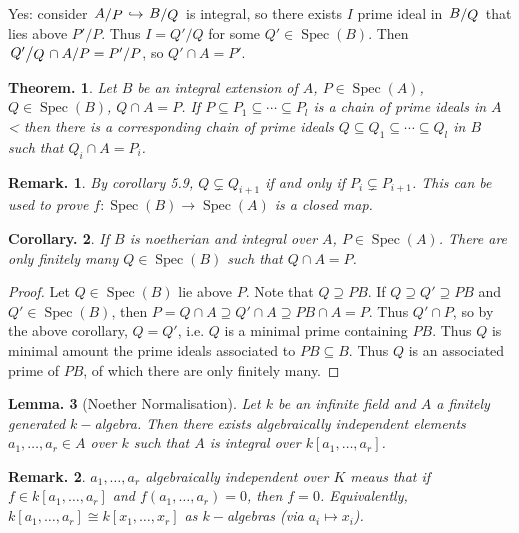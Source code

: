 \documentclass[11pt, a4paper]{memoir}
\newcommand{\hto}[0]{\ensuremath{\hookrightarrow}}
\theoremstyle{change}
\newtheorem{theorem}{Theorem.}[section]
\newtheorem{lemma}[theorem]{Lemma.}
\newtheorem{corollary}[theorem]{Corollary.}
\theoremstyle{plain}
\theoremstyle{nonumberplain}
\newtheorem{remark}{Remark.}
\newtheorem{proof}{Proof}
\DeclareMathOperator{\Spec}{Spec}
\newcommand{\quot}[2]{\mathchoice{\left.\raisebox{0.12em}{$#1$}\middle/\raisebox{-0.12em}{$#2$}\right.}
                                 {\left.\raisebox{0.06em}{$#1$}\middle/\raisebox{-0.06em}{$#2$}\right.}
                                 {\left.\raisebox{0.02em}{$#1$}\middle/\raisebox{-0.02em}{$#2$}\right.}
                                 {\left.\raisebox{0em}{$#1$}\middle/\raisebox{0em}{$#2$}\right.}}
\numberwithin{equation}{section}
\begin{document}
Yes: consider $\quot{A}{P}\hto \quot{B}{Q}$ is integral, so there exists $I$ prime ideal in $\quot{B}{Q}$ that lies above $P'/P$.
Thus $I=Q'/Q$ for some $Q'\in\Spec(B)$.
Then $\quot{Q'}{Q}\cap A/P=P'/P$, so $Q'\cap A=P'$.
\begin{theorem}
    Let $B$ be an integral extension of $A$, $P\in\Spec(A)$, $Q\in\Spec(B)$, $Q\cap A=P$.
    If $P\subseteq P_1\subseteq\cdots\subseteq P_l$ is a chain of prime ideals in $A$< then there is a corresponding chain of prime ideals $Q\subseteq Q_1\subseteq\cdots\subseteq Q_l$ in $B$ such that $Q_i\cap A=P_i$.
\end{theorem}
\begin{remark}
    By corollary 5.9, $Q\subsetneq Q_{i+1}$ if and only if $P_i\subsetneq P_{i+1}$.
    This can be used to prove $f:\Spec(B)\to\Spec(A)$ is a closed map.
\end{remark}
\begin{corollary}
    If $B$ is noetherian and integral over $A$, $P\in\Spec(A)$.
    There are only finitely many $Q\in\Spec(B)$ such that $Q\cap A=P$.
\end{corollary}
\begin{proof}
    Let $Q\in\Spec(B)$ lie above $P$.
    Note that $Q\supseteq PB$.
    If $Q\supseteq Q'\supseteq PB$ and $Q'\in\Spec(B)$, then $P=Q\cap A\supseteq Q'\cap A\supseteq PB\cap A=P$.
    Thus $Q'\cap P$, so by the above corollary, $Q=Q'$, i.e. $Q$ is a minimal prime containing $PB$.
    Thus $Q$ is minimal amount the prime ideals associated to $PB\subseteq B$.
    Thus $Q$ is an associated prime of $PB$, of which there are only finitely many.
\end{proof}
\begin{lemma}[Noether Normalisation]
    Let $k$ be an infinite field and $A$ a finitely generated $k-$algebra.
    Then there exists algebraically independent elements $a_1,\ldots,a_r\in A$ over $k$ such that $A$ is integral over $k[a_1,\ldots,a_r]$.
\end{lemma}
\begin{remark}
    $a_1,\ldots,a_r$ algebraically independent over $K$ meaus that if $f\in k[a_1,\ldots,a_r]$ and $f(a_1,\ldots,a_r)=0$, then $f=0$.
    Equivalently, $k[a_1,\ldots,a_r]\cong k[x_1,\ldots,x_r]$ as $k-$algebras (via $a_i\mapsto x_i$).
\end{remark}
\end{document}
